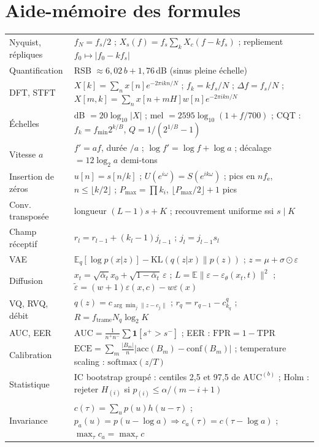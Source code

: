 \documentclass[10pt,a4paper]{article}
\newcommand{\AUC}{\mathrm{AUC}}
\newcommand{\TPR}{\mathrm{TPR}}
\newcommand{\FPR}{\mathrm{FPR}}
\begin{document}
\section{Aide-mémoire des formules}\label{app:formules}
\footnotesize
\begin{center}
\begin{tabularx}{\textwidth}{@{}L{3.6cm}X@{}}
\toprule
Nyquist, répliques & $f_N=f_s/2$ ; $X_s(f)=f_s\sum_k X_c(f-kf_s)$ ; repliement $f_0\mapsto|f_0-kf_s|$\\
Quantification & RSB $\ensuremath{\approx}6{,}02\,b+1{,}76$\,dB (sinus pleine échelle)\\
DFT, STFT & $X[k]=\sum_n x[n]e^{-2\pi ikn/N}$ ; $f_k=kf_s/N$ ; $\Delta f=f_s/N$ ; $X[m,k]=\sum_n x[n+mH]w[n]e^{-2\pi ikn/N}$\\
Échelles & dB $=20\log_{10}|X|$ ; mel $=2595\log_{10}(1+f/700)$ ; CQT : $f_k=f_{\min}2^{k/B}$, $Q=1/(2^{1/B}-1)$\\
Vitesse $a$ & $f'=af$, durée $/a$ ; $\log f'=\log f+\log a$ ; décalage $=12\log_2a$ demi-tons\\
Insertion de zéros & $u[n]=s[n/k]$ ; $U(e^{i\omega})=S(e^{ik\omega})$ ; pics en $nf_{\mathrm e}$, $n\le\lfloor k/2\rfloor$ ; $P_{\max}=\prod k_i$, $\lfloor P_{\max}/2\rfloor+1$ pics\\
Conv. transposée & longueur $(L-1)s+K$ ; recouvrement uniforme ssi $s\mid K$\\
Champ réceptif & $r_l=r_{l-1}+(k_l-1)j_{l-1}$ ; $j_l=j_{l-1}s_l$\\
VAE & $\mathbb E_q[\log p(x|z)]-\mathrm{KL}(q(z|x)\|p(z))$ ; $z=\mu+\sigma\odot\varepsilon$\\
Diffusion & $x_t=\sqrt{\bar\alpha_t}x_0+\sqrt{1-\bar\alpha_t}\,\varepsilon$ ; $L=\mathbb E\|\varepsilon-\varepsilon_\theta(x_t,t)\|^2$ ; $\tilde\varepsilon=(w+1)\varepsilon(x,c)-w\varepsilon(x)$\\
VQ, RVQ, débit & $q(z)=c_{\arg\min_j\|z-c_j\|}$ ; $r_q=r_{q-1}-c^q_{k_q}$ ; $R=f_{\mathrm{trame}}N_q\log_2K$\\
AUC, EER & $\AUC=\frac{1}{n^+n^-}\sum\mathbf 1[s^+>s^-]$ ; EER : $\FPR=1-\TPR$\\
Calibration & $\mathrm{ECE}=\sum_m\frac{|B_m|}{n}|\mathrm{acc}(B_m)-\mathrm{conf}(B_m)|$ ; temperature scaling : $\mathrm{softmax}(z/T)$\\
Statistique & IC bootstrap groupé : centiles 2,5 et 97,5 de $\AUC^{(b)}$ ; Holm : rejeter $H_{(i)}$ si $p_{(i)}\le\alpha/(m-i+1)$\\
Invariance & $c(\tau)=\sum_u p(u)h(u-\tau)$ ; $p_a(u)=p(u-\log a)\Rightarrow c_a(\tau)=c(\tau-\log a)$ ; $\max_\tau c_a=\max_\tau c$\\
\bottomrule
\end{tabularx}
\end{center}
\normalsize
\end{document}

